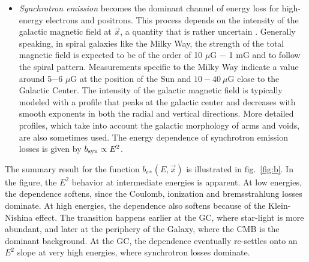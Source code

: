 \begin{itemize}
\begin{itemize}
\item {\em Synchrotron emission} becomes the dominant channel of energy loss for high-energy electrons and positrons. 
This process depends on the intensity of the galactic magnetic field at $\vec x$, a quantity that is rather uncertain \cite{Bgaldeterminations}. \label{Bgalactic}
Generally speaking, in spiral galaxies like the Milky Way, 
the strength of the total magnetic field is expected to be of the order of 10 $\mu$G $-$ 1 mG and to follow the spiral pattern. 
Measurements specific to the Milky Way indicate a value around 5$-$6 $\mu$G at the position of the Sun and $10-40~ \mu$G close to the Galactic Center. 
 The intensity of the galactic magnetic field is typically modeled with a profile that peaks at the galactic center and decreases with smooth exponents in both the radial and vertical directions. 
\label{galacticB} More detailed profiles, which take into account the galactic morphology of arms and voids, are also sometimes used. 
The energy dependence of synchrotron emission losses is given by $b_{\rm syn} \propto E^2$.
\end{itemize}

The summary result for the function $b_{e^\pm}(E,\vec{x})$ is illustrated in fig.~\ref{fig:b}.
In the figure, 
the $E^2$ behavior at intermediate energies is apparent.
 At low energies, the dependence softens, since the Coulomb, ionization and bremsstrahlung losses dominate. 
 At high energies, the dependence also softens because of the Klein-Nishina effect.
 The transition happens earlier at the GC, where star-light is more abundant, and later at the periphery of the Galaxy, where the CMB is the dominant background. 
At the GC, the dependence eventually
re-settles onto an $E^2$ slope at very high energies, where synchrotron losses dominate.  



\end{itemize}
